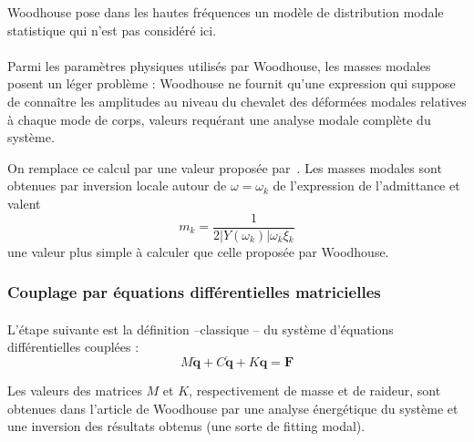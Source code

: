 Woodhouse pose dans les hautes fréquences un modèle de distribution modale
statistique qui n'est pas considéré ici.

    

\paragraph*{}

Parmi les paramètres physiques utilisés par Woodhouse, les masses modales
posent un léger problème : Woodhouse ne fournit qu'une expression qui suppose
de connaître les amplitudes au niveau du chevalet des déformées modales
relatives à chaque mode de corps, valeurs requérant une analyse modale
complète du système.
  
  On remplace ce calcul par une valeur proposée par~\textcite{pate14:phd}.
  Les masses modales sont obtenues par inversion locale autour de
\( \omega = \omega_k \) de l'expression de l'admittance et
valent \[ m_k = \frac{1}{2 |Y(\omega_k)| \omega{}_k \xi{}_k} \] une valeur plus
simple à calculer que celle proposée par Woodhouse.

\subsubsection{Couplage par équations différentielles matricielles}

  \paragraph*{}
  L'étape suivante est la définition --classique -- du système d'équations
différentielles cou\-plées :
\[ M \ddot{\bm{q}} + C \dot{\bm{q}} + K \bm{q} = \bm{F} \]

  Les valeurs des matrices \( M \) et \( K \), respectivement de masse et de
raideur, sont obtenues dans l'article de Woodhouse par une analyse énergétique
du système et une inversion des résultats obtenus (une sorte de fitting modal).

